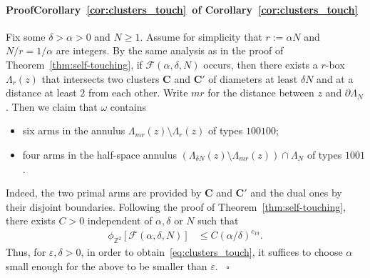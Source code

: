 \documentclass[a4paper,oneside,11pt]{article}
\numberwithin{equation}{section}
\numberwithin{equation}{section}
\numberwithin{equation}{section}
\newenvironment{proof}[1][\relax]%
  {\paragraph{Proof\ifx#1\relax\else~of #1\fi}}%
  {~\hfill$\square$\par\bigskip}
\newcommand{\calF}{\mathcal{F}}
\newcommand{\bbZ}{\mathbb{Z}}
\newcommand{\bfC}{\mathbf C}
\newcommand{\eps}{\varepsilon}
\newcommand{\La}{\Lambda}
\begin{document}
\begin{proof}[Corollary~\ref{cor:clusters_touch}]	
	Fix some $\delta >\alpha > 0$ and $N \geq 1$. Assume for simplicity that $r := \alpha N$ and $N/r=1/\alpha$ are integers.
	By the same analysis as in the proof of  Theorem~\ref{thm:self-touching}, 
	if $\calF(\alpha, \delta,N)$ occurs, then there exists a $r$-box $\La_r(z)$ that intersects two clusters $\bfC$ and $\bfC'$
	of diameters at least $\delta N$ and at a distance at least $2$ from each other. 
	Write $m r$ for the distance between $z$ and $\partial \La_N$.
	Then we claim that $\omega$ contains
	\begin{itemize}
    	\item[(a)] six arms in the annulus $\La_{mr}(z)\setminus \La_r(z)$ of types $100100$;
    	\item[(b)] four arms in the half-space annulus $(\La_{\delta N}(z)\setminus \La_{mr}(z)) \cap \La_N$ of types $1001$.
	\end{itemize}
	Indeed, the two primal arms are provided by $\bfC$ and $\bfC'$ and the dual ones by their disjoint boundaries. 
	Following the proof of Theorem~\ref{thm:self-touching}, there exists $C > 0$ independent of $\alpha,\delta$ or $N$ such that 
	\begin{align*}
		\phi_{\bbZ^2}[\calF(\alpha, \delta,N)]
		&\leq C (\alpha/\delta)^{c_{19}}.
	\end{align*}
	Thus, for $\eps,\delta > 0$, in order to obtain~\eqref{eq:clusters_touch},
	it suffices to choose $\alpha$ small enough for the above to be smaller than $\eps$.
\end{proof}
\end{document}

